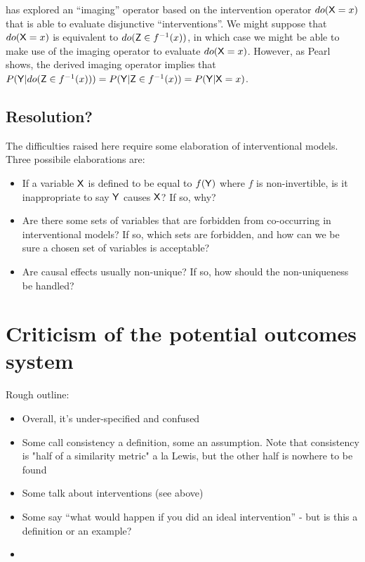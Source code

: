 \citet{pearl_physical_2017} has explored an ``imaging'' operator based on the intervention operator $do(\mathsf{X}=x)$ that is able to evaluate disjunctive ``interventions''. We might suppose that $do(\mathsf{X}=x)$ is equivalent to $do(\mathsf{Z}\in f^{-1}(x))$, in which case we might be able to make use of the imaging operator to evaluate $do(\mathsf{X}=x)$. However, as Pearl shows, the derived imaging operator implies that $P(\mathsf{Y}|do(\mathsf{Z}\in f^{-1}(x)))=P(\mathsf{Y}|\mathsf{Z}\in f^{-1}(x))=P(\mathsf{Y}|\mathsf{X}=x)$.

\subsection{Resolution?}

The difficulties raised here require some elaboration of interventional models. Three possibile elaborations are:
\begin{itemize}
	\item If a variable $\mathsf{X}$ is defined to be equal to $f(\mathsf{Y})$ where $f$ is non-invertible, is it inappropriate to say $\mathsf{Y}$ causes $\mathsf{X}$? If so, why?
	\item Are there some sets of variables that are forbidden from co-occurring in interventional models? If so, which sets are forbidden, and how can we be sure a chosen set of variables is acceptable?
	\item Are causal effects usually non-unique? If so, how should the non-uniqueness be handled?
\end{itemize}


\section{Criticism of the potential outcomes system}


Rough outline:

\begin{itemize}
 \item Overall, it's under-specified and confused
 \item Some call consistency a definition, some an assumption. Note that consistency is "half of a similarity metric" a la Lewis, but the other half is nowhere to be found
 \item Some talk about interventions (see above)
 \item Some say ``what would happen if you did an ideal intervention'' - but is this a definition or an example?
 \item 
\end{itemize}

